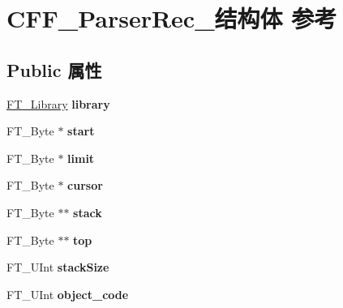 \hypertarget{struct_c_f_f___parser_rec__}{}\section{C\+F\+F\+\_\+\+Parser\+Rec\+\_\+结构体 参考}
\label{struct_c_f_f___parser_rec__}
\subsection*{Public 属性}
\begin{DoxyCompactItemize}
\item 
\mbox{\label{struct_c_f_f___parser_rec___ae2edcd418c21004a391e07134307f4bf}} 
\hyperlink{struct_f_t___library_rec__}{F\+T\+\_\+\+Library} {\bfseries library}
\item 
\mbox{\label{struct_c_f_f___parser_rec___ab3c269c1747f86c68923c1b584317c4a}} 
F\+T\+\_\+\+Byte $\ast$ {\bfseries start}
\item 
\mbox{\label{struct_c_f_f___parser_rec___a08ed6bbbae074a5787484aa3f41d1177}} 
F\+T\+\_\+\+Byte $\ast$ {\bfseries limit}
\item 
\mbox{\label{struct_c_f_f___parser_rec___acc3150914f89420516cf626ab5c671d9}} 
F\+T\+\_\+\+Byte $\ast$ {\bfseries cursor}
\item 
\mbox{\label{struct_c_f_f___parser_rec___a5dc1e90da40c1356088372d82aa89bb2}} 
F\+T\+\_\+\+Byte $\ast$$\ast$ {\bfseries stack}
\item 
\mbox{\label{struct_c_f_f___parser_rec___aa4729636d680aa22da6289747bfc1d28}} 
F\+T\+\_\+\+Byte $\ast$$\ast$ {\bfseries top}
\item 
\mbox{\label{struct_c_f_f___parser_rec___ac538fe23e57da08bfdd9d26fd19d3d23}} 
F\+T\+\_\+\+U\+Int {\bfseries stack\+Size}
\item 
\mbox{\label{struct_c_f_f___parser_rec___ab7ea9ac51d4a64309786f50f5bf3eb93}} 
F\+T\+\_\+\+U\+Int {\bfseries object\+\_\+code}

\end{DoxyCompactItemize}
